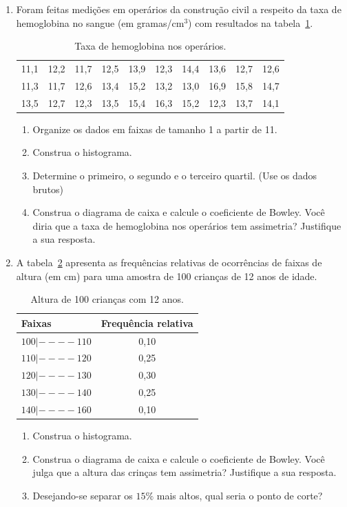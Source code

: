 \documentclass[12pt, a4paper]{article}
\begin{document}
\begin{enumerate}[1-]
	\item Foram feitas medições em operários da construção civil a respeito da taxa de hemoglobina no sangue (em gramas/cm$^3$) com resultados na tabela~\ref{tab:hemoglobina}.
	\begin{table}[htbp]
		\centering
		\caption{Taxa de hemoglobina nos operários.}
		\label{tab:hemoglobina}
		\begin{tabular}{cccccccccc}
			\toprule
			11,1 & 12,2 & 11,7 & 12,5 & 13,9 & 12,3 & 14,4 & 13,6 & 12,7 & 12,6 \\
			11,3 & 11,7 & 12,6 & 13,4 & 15,2 & 13,2 & 13,0 & 16,9 & 15,8 & 14,7 \\
			13,5 & 12,7 & 12,3 & 13,5 & 15,4 & 16,3 & 15,2 & 12,3 & 13,7 & 14,1 \\
			\bottomrule
		\end{tabular}
	\end{table}
	\begin{enumerate}
		\item Organize os dados em faixas de tamanho 1 a partir de 11.
		\item Construa o histograma.
		\item Determine o primeiro, o segundo e o terceiro quartil. (Use os dados brutos)
		\item Construa o diagrama de caixa e calcule o coeficiente de Bowley. Você diria que a taxa de hemoglobina nos operários tem assimetria? Justifique a sua resposta.
	\end{enumerate}
	
	\item A tabela~\ref{tab:criancas} apresenta as frequências relativas de ocorrências de faixas de altura (em cm) para uma amostra de 100 crianças de 12 anos de idade.
	\begin{table}[htbp]
		\centering
		\caption{Altura de 100 crianças com 12 anos.}
		\label{tab:criancas}
		\begin{tabular}{l|c}
			\toprule
			Faixas & Frequência relativa \\ \midrule
			$100 |---- 110$ & 0,10 \\ 
			$110 |---- 120$ & 0,25 \\
			$120 |---- 130$ & 0,30 \\
			$130 |---- 140$ & 0,25 \\
			$140 |---- 160$ & 0,10 \\ \toprule
		\end{tabular}
	\end{table}
	
	\begin{enumerate}
		\item Construa o histograma.
		\item Construa o diagrama de caixa e calcule o coeficiente de Bowley. Você julga que a altura das crinças tem assimetria? Justifique a sua resposta.
		\item Desejando-se separar os $15\%$ mais altos, qual seria o ponto de corte?
	\end{enumerate}
		
\end{enumerate}
\end{document}
